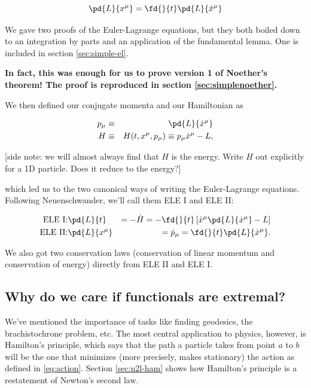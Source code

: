 \documentclass[12pt]{article}
\newcommand{\coord}{x}
\newcommand{\xd}{\dot{\coord}}
\newcommand{\xmu}{\coord^\mu}
\newcommand{\xdmu}{\xd^\mu}
\newcommand{\pmu}{p_\mu}
\newcommand{\pdmu}{\dot{p}_\mu}
\numberwithin{equation}{section}
\begin{document}
\begin{equation*}
  \pd{L}{\xmu} = \fd{}{t}\pd{L}{\xdmu}
\end{equation*}

We gave two proofs of the Euler-Lagrange equations, but they
both boiled down to an integration by parts and an application of the
fundamental lemma. One is included in section \ref{sec:simple-el}.

{\bf In fact, this was enough for us to prove version 1 of Noether's theorem! The proof is reproduced in section \ref{sec:simplenoether}.}

We then defined our conjugate momenta and our Hamiltonian as

\begin{eqnarray*}
  \pmu &\equiv& \pd{L}{\xdmu} \\
  H &\equiv& H(t,\xmu,\pmu) \equiv \pmu\xdmu - L,
\end{eqnarray*}

[side note: we will almost always find that $H$ is the energy. Write $H$ out explicitly for a 1D particle. Does it reduce to the energy?]

which led us to the two canonical ways of writing the Euler-Lagrange
equations. Following Neuenschwander, we'll call them ELE I and ELE II:

\begin{eqnarray}
  \label{eq:ele1}
  \textrm{ELE I:} & \pd{L}{t} &= -\dot{H} = -\fd{}{t} \left[  \xdmu\pd{L}{\xdmu} - L\right ] \\
  \label{eq:ele2}
  \textrm{ELE II:} & \pd{L}{\xmu} &= \pdmu = \fd{}{t}\pd{L}{\xdmu}.
\end{eqnarray}

We also got two conservation laws (conservation of linear momentum and conservation of energy) directly from ELE II and ELE I.

\subsection{Why do we care if functionals are extremal?}
We've mentioned the importance of tasks like finding geodesics, the brachistochrone problem, etc. The most central application to physics, however, is Hamilton's principle, which says that the path a particle takes from point $a$ to $b$ will be the one that minimizes (more precisely, makes stationary) the action as defined in \ref{eq:action}. Section \ref{sec:n2l-ham} shows how Hamilton's principle is a restatement of Newton's second law.
\end{document}
